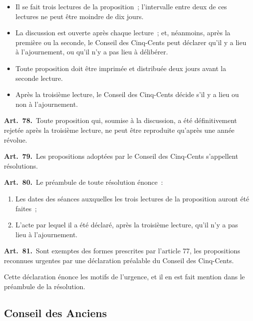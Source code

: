 \documentclass[french,twoside]{book} %
\newcommand{\labelchar}[1]{\textbf{\color{rubric} #1}}
\begin{document}
\begin{itemize}[itemsep=0pt,topsep=0pt,partopsep=0pt,parskip=0pt]
\item Il se fait trois lectures de la proposition ; l’intervalle entre deux de ces lectures ne peut être moindre de dix jours.
\item La discussion est ouverte après chaque lecture ; et, néanmoins, après la première ou la seconde, le Conseil des Cinq-Cents peut déclarer qu’il y a lieu à l’ajournement, ou qu’il n’y a pas lieu à délibérer.
\item Toute proposition doit être imprimée et distribuée deux jours avant la seconde lecture.
\item Après la troisième lecture, le Conseil des Cinq-Cents décide s’il y a lieu ou non à l’ajournement.
\end{itemize}

\labelchar{Art. 78.} Toute proposition qui, soumise à la discussion, a été définitivement rejetée après la troisième lecture, ne peut être reproduite qu’après une année révolue.\par
\labelchar{Art. 79.} Les propositions adoptées par le Conseil des Cinq-Cents s’appellent résolutions.\par
\labelchar{Art. 80.} Le préambule de toute résolution énonce :\par

\begin{enumerate}[itemsep=0pt,topsep=0pt,partopsep=0pt,parskip=0pt]
\item Les dates des séances auxquelles les trois lectures de la proposition auront été faites ;
\item L’acte par lequel il a été déclaré, après la troisième lecture, qu’il n’y a pas lieu à l’ajournement.
\end{enumerate}

\labelchar{Art. 81.} Sont exemptes des formes prescrites par l’article 77, les propositions reconnues urgentes par une déclaration préalable du Conseil des Cinq-Cents.\par
Cette déclaration énonce les motifs de l’urgence, et il en est fait mention dans le préambule de la résolution.

\subsection[{Conseil des Anciens}]{Conseil des Anciens}
\end{document}
